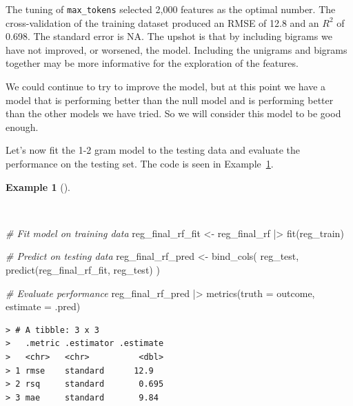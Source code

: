 \documentclass[
  letterpaper,
  DIV=11,
  numbers=noendperiod]{scrreprt}
\newenvironment{Shaded}{\begin{snugshade}}{\end{snugshade}}
\newcommand{\AttributeTok}[1]{\textcolor[rgb]{0.00,0.00,0.00}{#1}}
\newcommand{\CommentTok}[1]{\textcolor[rgb]{0.00,0.00,0.00}{\textit{#1}}}
\newcommand{\FunctionTok}[1]{\textcolor[rgb]{0.00,0.00,0.00}{#1}}
\newcommand{\NormalTok}[1]{\textcolor[rgb]{0.00,0.00,0.00}{#1}}
\newcommand{\OtherTok}[1]{\textcolor[rgb]{0.00,0.00,0.00}{#1}}
\newcommand{\SpecialCharTok}[1]{\textcolor[rgb]{0.00,0.00,0.00}{#1}}
\theoremstyle{definition}
\newtheorem{example}{Example}[chapter]
\theoremstyle{remark}
\begin{document}
The tuning of \texttt{max\_tokens} selected 2,000 features as the
optimal number. The cross-validation of the training dataset produced an
RMSE of 12.8 and an \(R^2\) of 0.698. The standard error is NA. The
upshot is that by including bigrams we have not improved, or worsened,
the model. Including the unigrams and bigrams together may be more
informative for the exploration of the features.

We could continue to try to improve the model, but at this point we have
a model that is performing better than the null model and is performing
better than the other models we have tried. So we will consider this
model to be good enough.

Let's now fit the 1-2 gram model to the testing data and evaluate the
performance on the testing set. The code is seen in
Example~\ref{exm-pda-reg-model-spec-random-forest-workflow-tune-select-fit-evaluate-test}.

\begin{example}[]\protect\hypertarget{exm-pda-reg-model-spec-random-forest-workflow-tune-select-fit-evaluate-test}{}\label{exm-pda-reg-model-spec-random-forest-workflow-tune-select-fit-evaluate-test}

~

\begin{Shaded}
\begin{Highlighting}[]
\CommentTok{\# Fit model on training data}
\NormalTok{reg\_final\_rf\_fit }\OtherTok{\textless{}{-}}
\NormalTok{  reg\_final\_rf }\SpecialCharTok{|\textgreater{}}
  \FunctionTok{fit}\NormalTok{(reg\_train)}

\CommentTok{\# Predict on testing data}
\NormalTok{reg\_final\_rf\_pred }\OtherTok{\textless{}{-}}
  \FunctionTok{bind\_cols}\NormalTok{(}
\NormalTok{    reg\_test,}
    \FunctionTok{predict}\NormalTok{(reg\_final\_rf\_fit, reg\_test)}
\NormalTok{  )}

\CommentTok{\# Evaluate performance}
\NormalTok{reg\_final\_rf\_pred }\SpecialCharTok{|\textgreater{}}
  \FunctionTok{metrics}\NormalTok{(}\AttributeTok{truth =}\NormalTok{ outcome, }\AttributeTok{estimate =}\NormalTok{ .pred)}
\end{Highlighting}
\end{Shaded}

\begin{verbatim}
> # A tibble: 3 x 3
>   .metric .estimator .estimate
>   <chr>   <chr>          <dbl>
> 1 rmse    standard      12.9  
> 2 rsq     standard       0.695
> 3 mae     standard       9.84
\end{verbatim}

\end{example}
\end{document}
